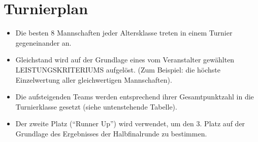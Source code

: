 \documentclass[a4paper,12pt]{article}
\begin{document}
\section{Turnierplan}
\begin{itemize}
	\item Die besten 8 Mannschaften jeder Altersklasse treten in einem
		Turnier gegeneinander an.
	\item Gleichstand wird auf der Grundlage eines vom Veranstalter
		gewählten LEISTUNGSKRITERIUMS aufgelöst. (Zum Beispiel: die
		höchste Einzelwertung aller gleichwertigen Mannschaften).
	\item Die aufsteigenden Teams werden entsprechend ihrer Gesamtpunktzahl
		in die Turnierklasse gesetzt (siehe untenstehende Tabelle).
		\begin{figure}[H]
			\centering
			\def\svgwidth{\columnwidth}
			
		\end{figure}
	\item Der zweite Platz ("`Runner Up"') wird verwendet, um den 3. Platz
		auf der Grundlage des Ergebnisses der Halbfinalrunde zu
		bestimmen.
\end{itemize}
\end{document}
